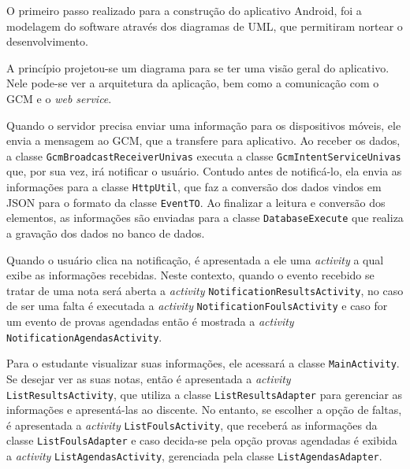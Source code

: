 
	\par O primeiro passo realizado para a construção do aplicativo Android, foi a
modelagem do software através dos diagramas de UML, que permitiram nortear o
desenvolvimento.

	\par A princípio projetou-se um diagrama para se ter uma visão geral do
aplicativo. Nele pode-se ver a arquitetura da aplicação, bem como a comunicação
com o GCM e o \textit{web service}.

	\par Quando o servidor precisa enviar uma informação para os dispositivos
móveis, ele envia a mensagem ao GCM, que a transfere para aplicativo. Ao
receber os dados, a classe \texttt{GcmBroadcastReceiverUnivas} executa a classe
\texttt{GcmIntentServiceUnivas} que, por sua vez, irá notificar o usuário.
Contudo antes de notificá-lo, ela envia as informações para a classe
\texttt{HttpUtil}, que faz a conversão dos dados vindos em JSON para o formato
da classe \texttt{EventTO}. Ao finalizar a leitura e conversão dos elementos,
as informações são enviadas para a classe \texttt{DatabaseExecute} que realiza
a gravação dos dados no banco de dados.

	\par Quando o usuário clica na notificação, é apresentada a ele uma
\textit{activity} a qual exibe as informações recebidas. Neste contexto, quando
o evento recebido se tratar de uma nota será aberta a \textit{activity}
\texttt{NotificationResultsActivity}, no caso de ser uma falta é executada a
\textit{activity} \texttt{NotificationFoulsActivity} e caso for um evento de
provas agendadas então é mostrada a \textit{activity}
\texttt{NotificationAgendasActivity}.

	\par Para o estudante visualizar suas informações, ele acessará a classe
\texttt{MainActivity}. Se desejar ver as suas notas, então é apresentada a
\textit{activity} \texttt{ListResultsActivity}, que utiliza a classe
\texttt{ListResultsAdapter} para gerenciar as informações e apresentá-las ao
discente. No entanto, se escolher a opção de faltas, é apresentada a
\textit{activity} \texttt{ListFoulsActivity}, que receberá as informações da
classe \texttt{ListFoulsAdapter} e caso decida-se pela opção provas agendadas é
exibida a \textit{activity} \texttt{ListAgendasActivity}, gerenciada pela
classe \texttt{ListAgendasAdapter}.

